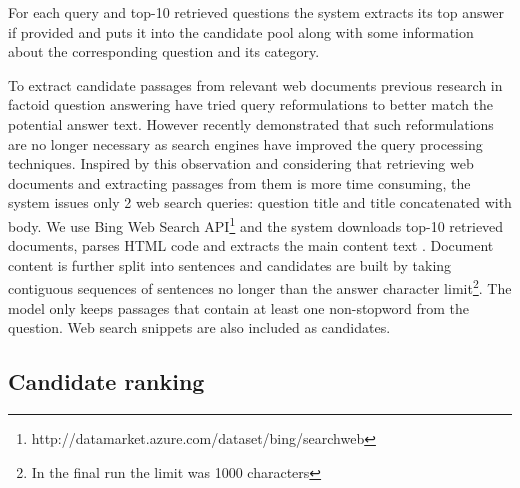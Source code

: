 \documentclass[]{article}
\begin{document}
For each query and top-10 retrieved questions the system extracts its top answer if provided and puts it into the candidate pool along with some information about the corresponding question and its category.

To extract candidate passages from relevant web documents previous research in factoid question answering have tried query reformulations \cite{Agichtein:2001:LSE:371920.371976} to better match the potential answer text.
However recently \cite{askmsr_plus15} demonstrated that such reformulations are no longer necessary as search engines have improved the query processing techniques.
Inspired by this observation and considering that retrieving web documents and extracting passages from them is more time consuming, the system issues only 2 web search queries: question title and title concatenated with body. 
We use Bing Web Search API\footnote{http://datamarket.azure.com/dataset/bing/searchweb} and the system downloads top-10 retrieved documents, parses HTML code and extracts the main content text \cite{Kohlschutter_2010}.
Document content is further split into sentences \cite{manning2014stanford} and candidates are built by taking contiguous sequences of sentences no longer than the answer character limit\footnote{In the final run the limit was 1000 characters}.
The model only keeps passages that contain at least one non-stopword from the question.
Web search snippets are also included as candidates.

\subsection{Candidate ranking}
\end{document}
